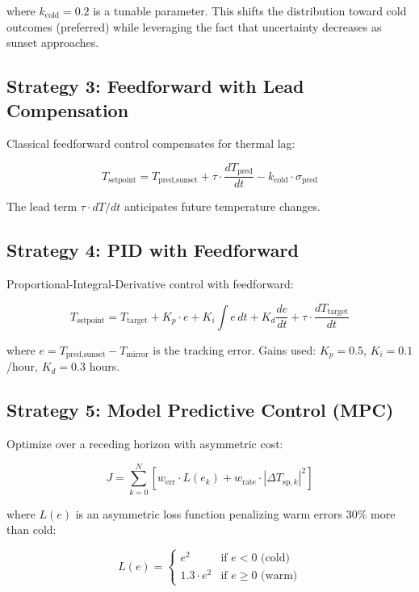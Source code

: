 \documentclass[11pt,letterpaper]{article}
\begin{document}
where $k_{\text{cold}} = 0.2$ is a tunable parameter. This shifts the distribution toward cold outcomes (preferred) while leveraging the fact that uncertainty decreases as sunset approaches.

\subsection{Strategy 3: Feedforward with Lead Compensation}

Classical feedforward control compensates for thermal lag:

\begin{equation}
T_{\text{setpoint}} = T_{\text{pred,sunset}} + \tau \cdot \frac{dT_{\text{pred}}}{dt} - k_{\text{cold}} \cdot \sigma_{\text{pred}}
\end{equation}

The lead term $\tau \cdot dT/dt$ anticipates future temperature changes.

\subsection{Strategy 4: PID with Feedforward}

Proportional-Integral-Derivative control with feedforward:

\begin{equation}
T_{\text{setpoint}} = T_{\text{target}} + K_p \cdot e + K_i \int e \, dt + K_d \frac{de}{dt} + \tau \cdot \frac{dT_{\text{target}}}{dt}
\end{equation}

where $e = T_{\text{pred,sunset}} - T_{\text{mirror}}$ is the tracking error. Gains used: $K_p = 0.5$, $K_i = 0.1$/hour, $K_d = 0.3$ hours.

\subsection{Strategy 5: Model Predictive Control (MPC)}

Optimize over a receding horizon with asymmetric cost:

\begin{equation}
J = \sum_{k=0}^{N} \left[ w_{\text{err}} \cdot L(e_k) + w_{\text{rate}} \cdot |\Delta T_{\text{sp},k}|^2 \right]
\end{equation}

where $L(e)$ is an asymmetric loss function penalizing warm errors 30\% more than cold:

\begin{equation}
L(e) = \begin{cases}
e^2 & \text{if } e < 0 \text{ (cold)} \\
1.3 \cdot e^2 & \text{if } e \geq 0 \text{ (warm)}
\end{cases}
\end{equation}
\end{document}
